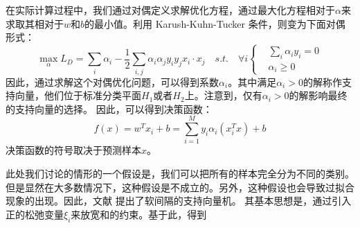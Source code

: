 在实际计算过程中，我们通过对偶定义求解优化方程，通过最大化方程相对于$\alpha$来求取其相对于$w$和$b$的最小值。利用 Karush-Kuhn-Tucker 条件，则变为下面对偶形式：
\begin{equation}
	\max \limits_{\alpha} L_D=\sum_i{\alpha_i}-\frac{1}{2}\sum_{i,j}\alpha_i\alpha_jy_iy_jx_i\cdot x_j \quad s.t. \quad \forall i
	\left\{
		\begin{aligned}
	   &\sum_i{\alpha_iy_i}=0  \\
	   &\alpha_i \geq 0
	   \end{aligned}
		\right.
\end{equation}
因此，通过求解这个对偶优化问题，可以得到系数$\alpha_i$。其中满足$\alpha_i>0$的解称作支持向量，他们位于标准分类平面$H_1$或者$H_2$上。注意到，仅有$\alpha_i>0$的解影响最终的支持向量的选择。
因此，可以得到决策函数：
\begin{equation}
	f(x)=w^Tx_i+b=\sum_{i=1}^My_i\alpha_i(x_i^Tx)+b
\end{equation}
决策函数的符号取决于预测样本$x$。

此处我们讨论的情形的一个假设是，我们可以把所有的样本完全分为不同的类别。但是显然在大多数情况下，这种假设是不成立的。另外，这种假设也会导致过拟合现象的出现。因此，文献 \cite{cortes1995support} 提出了软间隔的支持向量机。
其基本思想是，通过引入正的松弛变量$\xi_i$来放宽和的约束。基于此，得到


